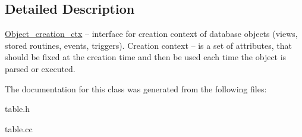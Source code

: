 \subsection{Detailed Description}
\mbox{\hyperlink{classObject__creation__ctx}{Object\+\_\+creation\+\_\+ctx}} -- interface for creation context of database objects (views, stored routines, events, triggers). Creation context -- is a set of attributes, that should be fixed at the creation time and then be used each time the object is parsed or executed. 

The documentation for this class was generated from the following files\+:\begin{DoxyCompactItemize}
\item 
table.\+h\item 
table.\+cc\end{DoxyCompactItemize}
